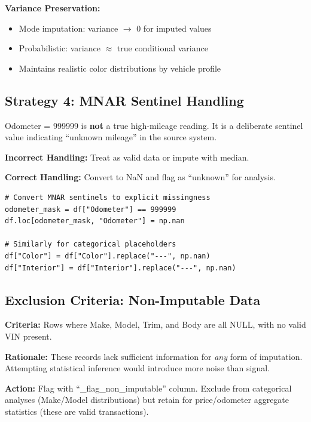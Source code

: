 \documentclass[12pt,a4paper]{article}
\begin{document}
\textbf{Variance Preservation:}
\begin{itemize}
    \item Mode imputation: variance $\rightarrow$ 0 for imputed values
    \item Probabilistic: variance $\approx$ true conditional variance
    \item Maintains realistic color distributions by vehicle profile
\end{itemize}

\subsection{Strategy 4: MNAR Sentinel Handling}

\begin{warningbox}
Odometer = 999999 is \textbf{not} a true high-mileage reading. It is a deliberate sentinel value indicating ``unknown mileage'' in the source system.

\textbf{Incorrect Handling:} Treat as valid data or impute with median.

\textbf{Correct Handling:} Convert to NaN and flag as ``unknown'' for analysis.
\end{warningbox}

\begin{lstlisting}
# Convert MNAR sentinels to explicit missingness
odometer_mask = df["Odometer"] == 999999
df.loc[odometer_mask, "Odometer"] = np.nan

# Similarly for categorical placeholders
df["Color"] = df["Color"].replace("---", np.nan)
df["Interior"] = df["Interior"].replace("---", np.nan)
\end{lstlisting}

\subsection{Exclusion Criteria: Non-Imputable Data}

\begin{issuebox}
\textbf{Criteria:} Rows where Make, Model, Trim, and Body are all NULL, with no valid VIN present.

\textbf{Rationale:} These records lack sufficient information for \textit{any} form of imputation. Attempting statistical inference would introduce more noise than signal.

\textbf{Action:} Flag with ``\_flag\_non\_imputable'' column. Exclude from categorical analyses (Make/Model distributions) but retain for price/odometer aggregate statistics (these are valid transactions).
\end{issuebox}
\end{document}
